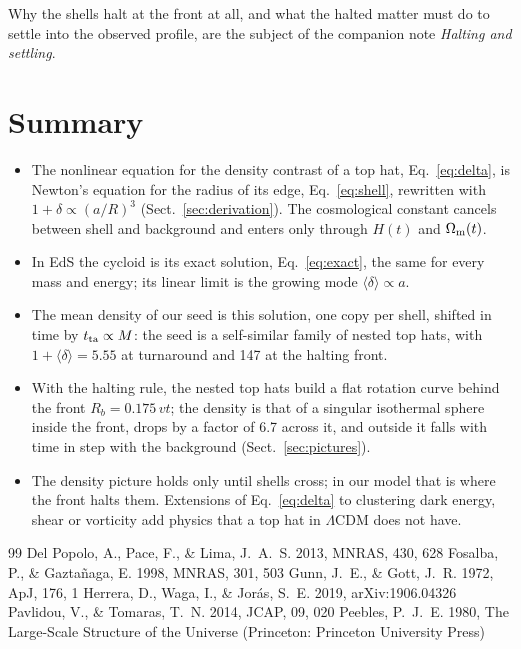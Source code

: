 \documentclass[11pt,a4paper]{article}
\newcommand{\Rb}{R_b}
\newcommand{\md}{\langle\delta\rangle}
\begin{document}
Why the shells halt at the front at all, and what the halted matter must do
to settle into the observed profile, are the subject of the companion note
\emph{Halting and settling}.

\section{Summary}

\begin{itemize}
\item The nonlinear equation for the density contrast of a top hat,
Eq.~\eqref{eq:delta}, is Newton's equation for the radius of its edge,
Eq.~\eqref{eq:shell}, rewritten with
$1+\delta\propto(a/R)^{3}$ (Sect.~\ref{sec:derivation}). The
cosmological constant cancels between shell and background and enters
only through $H(t)$ and $\Omega_{\rm m}(t)$.
\item In EdS the cycloid is its exact solution, Eq.~\eqref{eq:exact},
the same for every mass and energy; its linear limit is the growing mode
$\md\propto a$.
\item The mean density of our seed is this solution, one copy per shell,
shifted in time by $t_{\rm ta}\propto M$: the seed is a self-similar
family of nested top hats, with $1+\md=5.55$ at turnaround and 147 at
the halting front.
\item With the halting rule, the nested top hats build a flat rotation curve
behind the front $\Rb=0.175\,vt$; the density is that of a singular
isothermal sphere inside the front, drops by a factor of 6.7 across it, and
outside it falls with time in step with the background
(Sect.~\ref{sec:pictures}).
\item The density picture holds only until shells cross; in our model
that is where the front halts them. Extensions of Eq.~\eqref{eq:delta}
to clustering dark energy, shear or vorticity
\citep{DelPopolo2013,Herrera2019} add physics that a top hat in
$\Lambda$CDM does not have.
\end{itemize}

\begin{thebibliography}{99}
 Del Popolo, A., Pace, F., \& Lima, J.~A.~S. 2013, MNRAS, 430, 628
 Fosalba, P., \& Gazta\~naga, E. 1998, MNRAS, 301, 503
 Gunn, J.~E., \& Gott, J.~R. 1972, ApJ, 176, 1
 Herrera, D., Waga, I., \& Jor\'as, S.~E. 2019, arXiv:1906.04326
 Pavlidou, V., \& Tomaras, T.~N. 2014, JCAP, 09, 020
 Peebles, P.~J.~E. 1980, The Large-Scale Structure of the Universe (Princeton: Princeton University Press)
\end{thebibliography}
\end{document}
